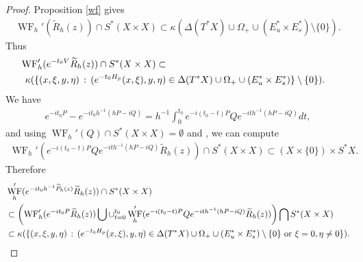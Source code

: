 \documentclass[reqno,12pt,letterpaper]{amsart}
\numberwithin{equation}{section}
\numberwithin{prop}{section}
\DeclareMathOperator{\WF}{WF}
\begin{document}
\begin{proof}
Proposition \ref{wf} gives
\begin{align*}
    \WF_h'(\widetilde{R}_h(z))\cap S^*(X\times X)\subset \kappa(\Delta(T^*X)\cup \Omega_+\cup(E_u^*\times E_s^*)\setminus\{0\}).
\end{align*}
Thus
\begin{align*}
     {\rm WF}_h'(e^{-t_0V}\widetilde{R}_h(z))\cap S^*(X\times X)\subset \\
\kappa(\{(x,\xi,y,\eta)\,:\,(e^{-t_0H_p}(x,\xi),y,\eta)&\in \Delta(T^*X)\cup \Omega_+\cup(E^*_u\times E^*_s)\}\setminus\{0\}).
\end{align*}
We have
\begin{align*}
    e^{-it_0P}- e^{-it_0h^{-1}(hP-iQ)}=h^{-1}\int_0^{t_0}e^{-i(t_0-t)P}Qe^{-ith^{-1}(hP-iQ)}dt,
\end{align*}
and using $\WF_h'(Q)\cap S^\ast(X\times X)=\emptyset$ and \cite[Lemma 3.7(iii)]{wavefront}, we can compute 
\begin{align*}
    \WF_h'(e^{-i(t_0-t)P}Qe^{-ith^{-1}(hP-iQ)}\widetilde{R}_h(z))\cap S^*(X\times X)\subset(X\times\{0\})\times S^*X.
\end{align*}
Therefore
\begin{align*}
    &\WF_h'(e^{-it_0h^{-1}\widetilde{P}_h(z)}\widetilde{R}_h(z))\cap S^*(X\times X)\\
    &\subset  \left({\rm WF}_h'(e^{-it_0P}\widetilde{R}_h(z))\bigcup \cup_{t=0}^{t_0}\WF_h'(e^{-i(t_0-t)P}Qe^{-ith^{-1}(hP-iQ)}\widetilde{R}_h(z))\right)\bigcap S^*(X\times X)\\
    &\subset \kappa(\{(x,\xi,y,\eta)\,:\,(e^{-t_0H_p}(x,\xi),y,\eta)\in \Delta(T^*X)\cup \Omega_+\cup(E^*_u\times E^*_s)\setminus\{0\} \text{ or } \xi=0,\eta\neq 0\}).
\end{align*}
\end{proof}
\end{document}
